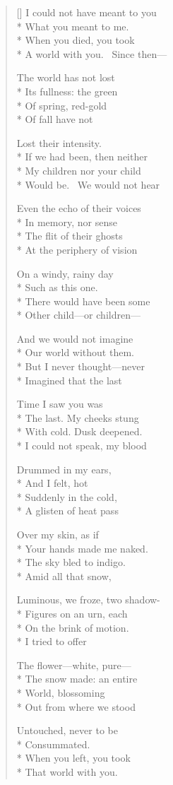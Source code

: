 \label{ch:december_22}
\settowidth{\versewidth}{A world with you.  Since then---}
\begin{verse}[\versewidth]
I could not have meant to you\\*
What you meant to me.\\*
When you died, you took\\*
A world with you.  Since then---

The world has not lost \\*
Its fullness: the green\\*
Of spring, red-gold\\*
Of fall have not

Lost their intensity.\\*
If we had been, then neither\\*
My children nor your child\\*
Would be.  We would not hear

Even the echo of their voices \\*
In memory, nor sense\\*
The flit of their ghosts\\*
At the periphery of vision

On a windy, rainy day \\*
Such as this one.\\*
There would have been some\\*
Other child---or children---

And we would not imagine\\*
Our world without them.\\*
But I never thought---never\\*
Imagined that the last

Time I saw you was\\*
The last. My cheeks stung\\*
With cold. Dusk deepened.\\*
I could not speak, my blood

Drummed in my ears,\\*
And I felt, hot\\*
Suddenly in the cold,\\*
A glisten of heat pass

Over my skin, as if\\*
Your hands made me naked.\\*
The sky bled to indigo.\\*
Amid all that snow,

Luminous, we froze, two shadow-\\*
Figures on an urn, each\\*
On the brink of motion.\\*
I tried to offer

The flower---white, pure---\\*
The snow made: an entire \\*
World, blossoming\\*
Out from where we stood

Untouched, never to be\\*
Consummated.\\*
When you left, you took\\*
That world with you.
\end{verse}
